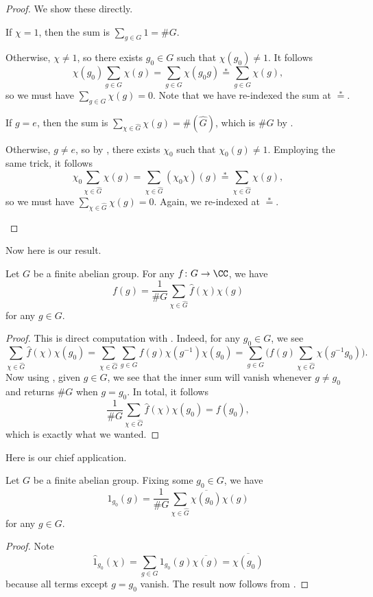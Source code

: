 \documentclass[../notes.tex]{subfiles}
\begin{document}
\begin{proof}
	We show these directly.
	\begin{listalph}
		\item If $\chi=1$, then the sum is $\sum_{g\in G}1=\#G$.
		
		Otherwise, $\chi\ne1$, so there exists $g_0\in G$ such that $\chi(g_0)\ne1$. It follows
		\[\chi(g_0)\sum_{g\in G}\chi(g)=\sum_{g\in G}\chi(g_0g)\stackrel*=\sum_{g\in G}\chi(g),\]
		so we must have $\sum_{g\in G}\chi(g)=0$. Note that we have re-indexed the sum at $\stackrel*=$.
		\item If $g=e$, then the sum is $\sum_{\chi\in \widehat{G}}\chi(g)=\#(\widehat{G})$, which is $\#G$ by .

		Otherwise, $g\ne e$, so by , there exists $\chi_0$ such that $\chi_0(g)\ne1$. Employing the same trick, it follows
		\[\chi_0\sum_{\chi\in \widehat{G}}\chi(g)=\sum_{\chi\in \widehat{G}}(\chi_0\chi)(g)\stackrel*=\sum_{\chi\in \widehat{G}}\chi(g),\]
		so we must have $\sum_{\chi\in \widehat{G}}\chi(g)=0$. Again, we re-indexed at $\stackrel*=$.
		\qedhere
	\end{listalph}
\end{proof}
Now here is our result.
\begin{theorem} \label{thm:finite-fourier-inversion}
	Let $G$ be a finite abelian group. For any $f\colon G\to\CC$, we have
	\[f(g)=\frac1{\#G}\sum_{\chi\in \widehat{G}}\widehat{f}(\chi)\chi(g)\]
	for any $g\in G$.
\end{theorem}
\begin{proof}
	This is direct computation with . Indeed, for any $g_0\in G$, we see
	\[\sum_{\chi\in \widehat{G}}\widehat{f}(\chi)\chi(g_0) = \sum_{\chi\in \widehat{G}}\sum_{g\in G}f(g)\chi\left(g^{-1}\right)\chi(g_0) = \sum_{g\in G}\Bigg(f(g)\sum_{\chi\in \widehat{G}}\chi\left(g^{-1}g_0\right)\Bigg).\]
	Now using , given $g\in G$, we see that the inner sum will vanish whenever $g\ne g_0$ and returns $\#G$ when $g=g_0$. In total, it follows
	\[\frac1{\#G}\sum_{\chi\in \widehat{G}}\widehat{f}(\chi)\chi(g_0)=f(g_0),\]
	which is exactly what we wanted.
\end{proof}
Here is our chief application.
\begin{corollary} \label{cor:indicate-g}
	Let $G$ be a finite abelian group. Fixing some $g_0\in G$, we have
	\[1_{g_0}(g)=\frac1{\#G}\sum_{\chi\in\widehat G}\overline{\chi(g_0)}\chi(g)\]
	for any $g\in G$.
\end{corollary}
\begin{proof}
	Note
	\[\widehat1_{g_0}(\chi)=\sum_{g\in G}1_{g_0}(g)\overline{\chi(g)}=\overline{\chi(g_0)}\]
	because all terms except $g=g_0$ vanish. The result now follows from .
\end{proof}
\end{document}

